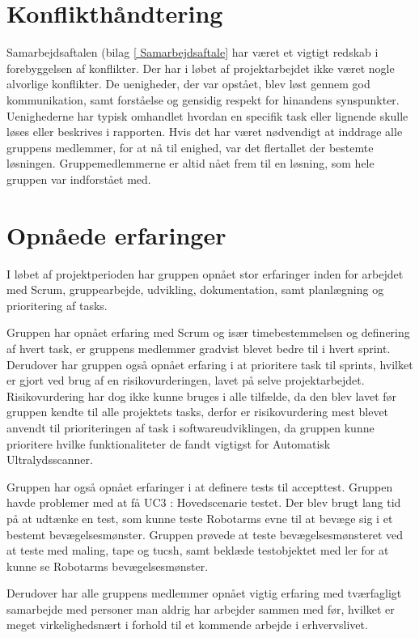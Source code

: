 \section{Konflikthåndtering}
Samarbejdsaftalen (bilag \ref{ Samarbejdsaftale} har været et vigtigt redskab i forebyggelsen af konflikter. Der har i løbet af projektarbejdet ikke været nogle alvorlige konflikter.  De uenigheder, der var opstået, blev løst gennem god kommunikation, samt forståelse og gensidig respekt for hinandens synspunkter. Uenighederne har typisk omhandlet hvordan en specifik task eller lignende skulle løses eller beskrives i rapporten. Hvis det har været nødvendigt at inddrage alle gruppens medlemmer, for at nå til enighed, var det flertallet der bestemte løsningen. Gruppemedlemmerne er altid nået frem til en løsning, som hele gruppen var indforstået med.

\section{Opnåede erfaringer}
I løbet af projektperioden har gruppen opnået stor erfaringer inden for arbejdet med Scrum, gruppearbejde, udvikling, dokumentation, samt planlægning og prioritering af tasks. 

Gruppen har opnået erfaring med Scrum og især timebestemmelsen og definering af hvert task, er gruppens medlemmer gradvist blevet bedre til i hvert sprint. Derudover har gruppen også opnået erfaring i at prioritere task til sprints, hvilket er gjort ved brug af en risikovurderingen, lavet på selve projektarbejdet. Risikovurdering har dog ikke kunne bruges i alle tilfælde, da den blev lavet før gruppen kendte til alle projektets tasks, derfor er risikovurdering mest blevet anvendt til prioriteringen af task i softwareudviklingen, da gruppen kunne prioritere hvilke funktionaliteter de fandt vigtigst for Automatisk Ultralydsscanner. 

Gruppen har også opnået erfaringer i at definere tests til accepttest. Gruppen havde problemer med at få UC3 : Hovedscenarie testet. Der blev brugt lang tid på at udtænke en test, som kunne teste Robotarms evne til at bevæge sig i et bestemt bevægelsesmønster. Gruppen prøvede at teste bevægelsesmønsteret ved at teste med maling, tape og tucsh, samt beklæde testobjektet med ler for at kunne se Robotarms bevægelsesmønster. 

Derudover har alle gruppens medlemmer opnået vigtig erfaring med tværfagligt samarbejde med personer man aldrig har arbejder sammen med før, hvilket er meget virkelighedsnært i forhold til et kommende arbejde i erhvervslivet.

